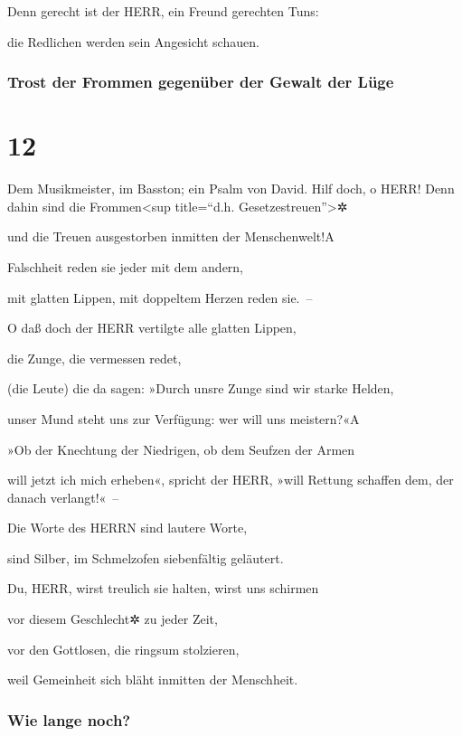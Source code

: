 Denn gerecht ist der HERR, ein Freund gerechten Tuns:

die Redlichen werden sein Angesicht schauen.

\hypertarget{trost-der-frommen-gegenuxfcber-der-gewalt-der-luxfcge}{%
\subsubsection{Trost der Frommen gegenüber der Gewalt der
Lüge}\label{trost-der-frommen-gegenuxfcber-der-gewalt-der-luxfcge}}

\hypertarget{section-11}{%
\section{12}\label{section-11}}

Dem Musikmeister, im Basston; ein Psalm von David.
Hilf doch, o HERR! Denn dahin sind die
Frommen\textless sup title=``d.h. Gesetzestreuen''\textgreater✲

und die Treuen ausgestorben inmitten der Menschenwelt!{A}

Falschheit reden sie jeder mit dem andern,

mit glatten Lippen, mit doppeltem Herzen reden sie.~--

O daß doch der HERR vertilgte alle glatten Lippen,

die Zunge, die vermessen redet,

(die Leute) die da sagen: »Durch unsre Zunge sind wir
starke Helden,

unser Mund steht uns zur Verfügung: wer will uns meistern?«{A}

»Ob der Knechtung der Niedrigen, ob dem Seufzen der Armen

will jetzt ich mich erheben«, spricht der HERR, »will Rettung schaffen
dem, der danach verlangt!«~--

Die Worte des HERRN sind lautere Worte,

sind Silber, im Schmelzofen siebenfältig geläutert.

Du, HERR, wirst treulich sie halten, wirst uns schirmen

vor diesem Geschlecht✲ zu jeder Zeit,

vor den Gottlosen, die ringsum stolzieren,

weil Gemeinheit sich bläht inmitten der Menschheit.

\hypertarget{wie-lange-noch}{%
\subsubsection{Wie lange noch?}\label{wie-lange-noch}}

